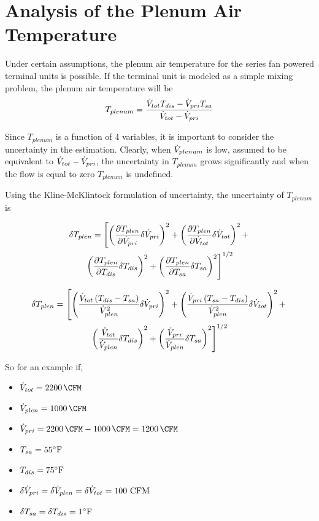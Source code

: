 \section{Analysis of the Plenum Air Temperature}

Under certain assumptions, the plenum air temperature for the series fan
powered terminal units is possible. If the terminal unit is modeled as a simple
mixing problem, the plenum air temperature will be 
\begin{equation}
    T_{plenum}=\frac{\dot{V}_{tot}T_{dis}-\dot{V}_{pri}T_{sa}}{\dot{V}_{tot} -\dot{V}_{pri}}
\end{equation}

Since \(T_{plenum}\) is a function of 4 variables, it is important to
consider the uncertainty in the estimation. Clearly, when
\(\dot{V}_{plenum}\) is low, assumed to be equivalent to \(\dot{V}_{tot} -
\dot{V}_{pri}\), the uncertainty in  \(T_{plenum}\) grows significantly and
when the flow is equal to zero \(T_{plenum}\) is undefined. 

Using the Kline-McKlintock formulation of uncertainty, the uncertainty
of \(T_{plenum}\) is 

\begin{multline}
    \delta T_{plen} = \left[\left( \pdv{T_{plen}}{\dot{V}_{pri}} \delta \dot{V}_{pri}   \right)^2  +\left( \pdv{T_{plen}}{\dot{V}_{tot}} \delta \dot{V}_{tot}   \right)^2 + \right. \\
    \left. \left( \pdv{T_{plen}}{T_{dis}} \delta T_{dis}   \right)^2 + \left( \pdv{T_{plen}}{T_{sa}} \delta T_{sa}   \right)^2  \right]^{1/2}
\end{multline}

\begin{multline}\label{eq:plenumUncertainty}
    \delta T_{plen} = \left[\left(  \frac{\dot{V}_{tot}\left(T_{dis}-T_{sa} \right)}{{\dot{V}_{plen}}^2}   \delta \dot{V}_{pri} \right)^2  +\left(\frac{\dot{V}_{pri}\left(T_{sa}-T_{dis} \right)}{{\dot{V}_{plen}}^2}      \delta \dot{V}_{tot}   \right)^2 + \right. \\
    \left. \left( \frac{\dot{V}_{tot}}{\dot{V}_{plen}} \delta T_{dis}   \right)^2 + \left(\frac{\dot{V}_{pri}}{\dot{V}_{plen}}  \delta T_{sa}   \right)^2  \right]^{1/2}
\end{multline}

So for an example if, 

\newcommand{\flowtotvalue}{\SI{2200}{\CFM}}
\newcommand{\plenflowvalue}{\SI{1000}{\CFM}}

\begin{itemize}
    \item \(\totflow{}=\flowtotvalue\)
    \item \(\plenflow{}=\plenflowvalue\)
    \item \(\priflow=\flowtotvalue - \plenflowvalue = \SI{1200}{\CFM} \)
    \item \(T_{sa} = 55^{\circ}\text{F} \)
    \item \(T_{dis} = 75^{\circ}\text{F} \)
    \item \(\delta\dot{V}_{pri}{}=\delta\dot{V}_{plen}=\delta\dot{V}_{tot}=100 \text{ CFM}\)
    \item \(\delta T_{sa} = \delta T_{dis} = 1^{\circ} \text{F} \)
\end{itemize}

